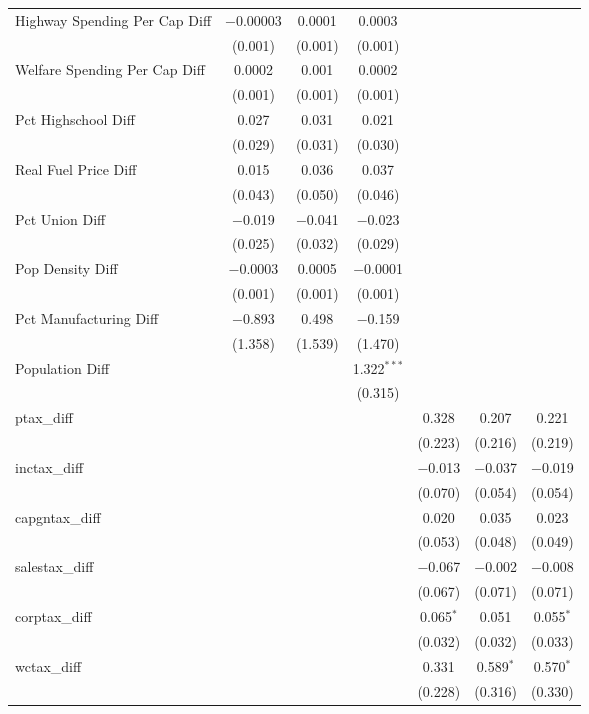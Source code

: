 \begin{table}[!htbp]
\begin{tabular}{@{\extracolsep{5pt}}lcccccc}
  Highway Spending Per Cap Diff & $-$0.00003 & 0.0001 & 0.0003 &  &  &  \\ 
  & (0.001) & (0.001) & (0.001) &  &  &  \\ 
  Welfare Spending Per Cap Diff & 0.0002 & 0.001 & 0.0002 &  &  &  \\ 
  & (0.001) & (0.001) & (0.001) &  &  &  \\ 
  Pct Highschool Diff & 0.027 & 0.031 & 0.021 &  &  &  \\ 
  & (0.029) & (0.031) & (0.030) &  &  &  \\ 
  Real Fuel Price Diff & 0.015 & 0.036 & 0.037 &  &  &  \\ 
  & (0.043) & (0.050) & (0.046) &  &  &  \\ 
  Pct Union Diff & $-$0.019 & $-$0.041 & $-$0.023 &  &  &  \\ 
  & (0.025) & (0.032) & (0.029) &  &  &  \\ 
  Pop Density Diff & $-$0.0003 & 0.0005 & $-$0.0001 &  &  &  \\ 
  & (0.001) & (0.001) & (0.001) &  &  &  \\ 
  Pct Manufacturing Diff & $-$0.893 & 0.498 & $-$0.159 &  &  &  \\ 
  & (1.358) & (1.539) & (1.470) &  &  &  \\ 
  Population Diff &  &  & 1.322$^{***}$ &  &  &  \\ 
  &  &  & (0.315) &  &  &  \\ 
  ptax\_diff &  &  &  & 0.328 & 0.207 & 0.221 \\ 
  &  &  &  & (0.223) & (0.216) & (0.219) \\ 
  inctax\_diff &  &  &  & $-$0.013 & $-$0.037 & $-$0.019 \\ 
  &  &  &  & (0.070) & (0.054) & (0.054) \\ 
  capgntax\_diff &  &  &  & 0.020 & 0.035 & 0.023 \\ 
  &  &  &  & (0.053) & (0.048) & (0.049) \\ 
  salestax\_diff &  &  &  & $-$0.067 & $-$0.002 & $-$0.008 \\ 
  &  &  &  & (0.067) & (0.071) & (0.071) \\ 
  corptax\_diff &  &  &  & 0.065$^{*}$ & 0.051 & 0.055$^{*}$ \\ 
  &  &  &  & (0.032) & (0.032) & (0.033) \\ 
  wctax\_diff &  &  &  & 0.331 & 0.589$^{*}$ & 0.570$^{*}$ \\ 
  &  &  &  & (0.228) & (0.316) & (0.330) \\ 

\end{tabular}
\end{table}
